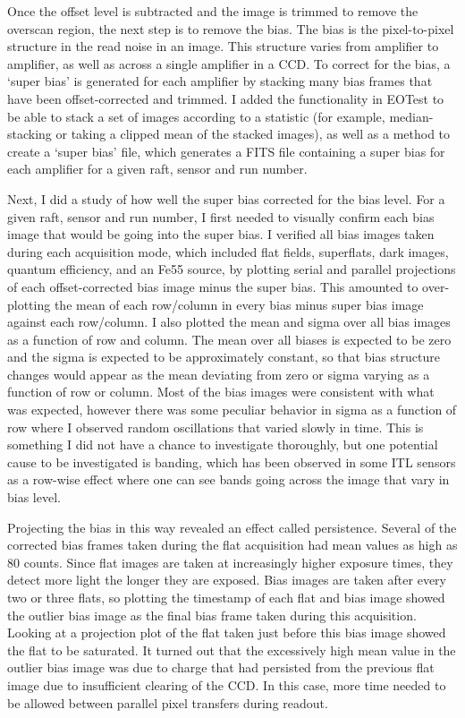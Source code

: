 Once the offset level is subtracted and the image is trimmed to remove the overscan region, the next step is to remove the bias. The bias is the pixel-to-pixel structure in the read noise in an image. This structure varies from amplifier to amplifier, as well as across a single amplifier in a CCD. To correct for the bias, a ‘super bias’ is generated for each amplifier by stacking many bias frames that have been offset-corrected and trimmed. I added the functionality in EOTest to be able to stack a set of images according to a statistic (for example, median-stacking or taking a clipped mean of the stacked images), as well as a method to create a ‘super bias’ file, which generates a FITS file containing a super bias for each amplifier for a given raft, sensor and run number. 

Next, I did a study of how well the super bias corrected for the bias level. For a given raft, sensor and run number, I first needed to visually confirm each bias image that would be going into the super bias. I verified all bias images taken during each acquisition mode, which included flat fields, superflats, dark images, quantum efficiency, and an Fe55 source, by plotting serial and parallel projections of each offset-corrected bias image minus the super bias. This amounted to over-plotting the mean of each row/column in every bias minus super bias image against each row/column. I also plotted the mean and sigma over all bias images as a function of row and column. The mean over all biases is expected to be zero and the sigma is expected to be approximately constant, so that bias structure changes would appear as the mean deviating from zero or sigma varying as a function of row or column. Most of the bias images were consistent with what was expected, however there was some peculiar behavior in sigma as a function of row where I observed random oscillations that varied slowly in time. This is something I did not have a chance to investigate thoroughly, but one potential cause to be investigated is banding, which has been observed in some ITL sensors as a row-wise effect where one can see bands going across the image that vary in bias level. 

Projecting the bias in this way revealed an effect called persistence. Several of the corrected bias frames taken during the flat acquisition had mean values as high as 80 counts. Since flat images are taken at increasingly higher exposure times, they detect more light the longer they are exposed. Bias images are taken after every two or three flats, so plotting the timestamp of each flat and bias image showed the outlier bias image as the final bias frame taken during this acquisition. Looking at a projection plot of the flat taken just before this bias image showed the flat to be saturated. It turned out that the excessively high mean value in the outlier bias image was due to charge that had persisted from the previous flat image due to insufficient clearing of the CCD. In this case, more time needed to be allowed between parallel pixel transfers during readout. 

